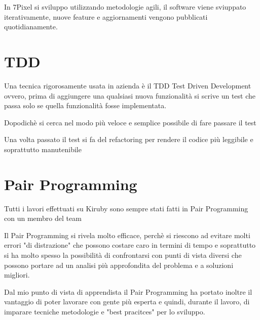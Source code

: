 


In 7Pixel si sviluppo utilizzando metodologie agili, il software viene sviuppato
iterativamente, nuove feature e aggiornamenti vengono pubblicati quotidianamente.

\section{TDD}
Una tecnica rigorosamente usata in azienda è il TDD Test Driven Development ovvero, prima di
aggiungere una qualsiasi nuova funzionalità si scrive un test che passa solo se 
quella funzionalità fosse implementata. 

Dopodichè si cerca nel modo più veloce e semplice possibile di fare passare il test

Una volta passato il test si fa del refactoring per rendere il codice più leggibile
e soprattutto manutenibile

\section{Pair Programming}
Tutti i lavori effettuati su Kiruby sono sempre stati fatti in Pair Programming
con un membro del team

Il Pair Programming si rivela molto efficace, perchè si riescono ad evitare molti
errori "di distrazione" che possono costare caro in termini di tempo e soprattutto
si ha molto spesso la possibilità di confrontarsi con punti di vista diversi che possono
portare ad un analisi più approfondita del problema e a soluzioni migliori. 

Dal mio punto di vista di apprendista il Pair Programming ha portato inoltre il vantaggio
di poter lavorare con gente più esperta e quindi, durante il lavoro, di imparare tecniche 
metodologie e "best pracitces" per lo sviluppo.

